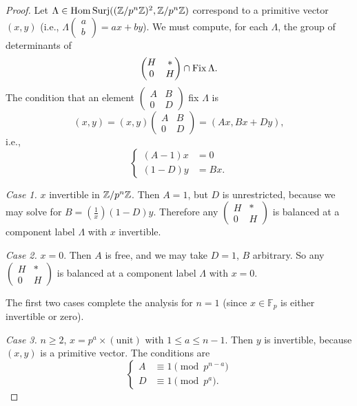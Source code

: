 \begin{proof}
Let $\Lambda \in \mathrm{Hom\,Surj}((\mathbb{Z}/p^n\mathbb{Z})^2, \mathbb{Z}/p^n\mathbb{Z})$ correspond to a primitive vector $(x,y)$ (i.e., $\Lambda\begin{pmatrix} a \\ b \end{pmatrix} = ax + by$). We must compute, for each $\Lambda$, the group of determinants of
\[
\begin{pmatrix} H & * \\ 0 & H \end{pmatrix} \cap \operatorname{Fix}\Lambda .
\]
The condition that an element $\begin{pmatrix} A & B \\ 0 & D \end{pmatrix}$ fix $\Lambda$ is
\[
(x,y) = (x,y)\begin{pmatrix} A & B \\ 0 & D \end{pmatrix} = (Ax, Bx + Dy) ,
\]
i.e.,
\[
\left\{
\begin{aligned}
(A - 1)x &= 0 \\
(1 - D)y &= Bx .
\end{aligned}
\right.
\]
\par
\emph{Case 1.} $x$ invertible in $\mathbb{Z}/p^n\mathbb{Z}$. Then $A = 1$, but $D$ is unrestricted, because we may solve for $B = \left(\frac{1}{x}\right)(1-D)y$. Therefore any $\begin{pmatrix} H & * \\ 0 & H \end{pmatrix}$ is balanced at a component label $\Lambda$ with $x$ invertible.
\par
\emph{Case 2.} $x = 0$. Then $A$ is free, and we may take $D = 1$, $B$ arbitrary. So any $\begin{pmatrix} H & * \\ 0 & H \end{pmatrix}$ is balanced at a component label $\Lambda$ with $x = 0$.
\par
The first two cases complete the analysis for $n = 1$ (since $x \in \mathbb{F}_p$ is either invertible or zero).
\par
\emph{Case 3.} $n \ge 2$, $x = p^a \times (\text{unit})$ with $1 \le a \le n-1$. Then $y$ is invertible, because $(x,y)$ is a primitive vector. The conditions are
\[
\left\{
\begin{aligned}
A &\equiv 1 \pmod{p^{n-a}} \\
D &\equiv 1 \pmod{p^a} .
\end{aligned}
\right.
\]
\end{proof}
